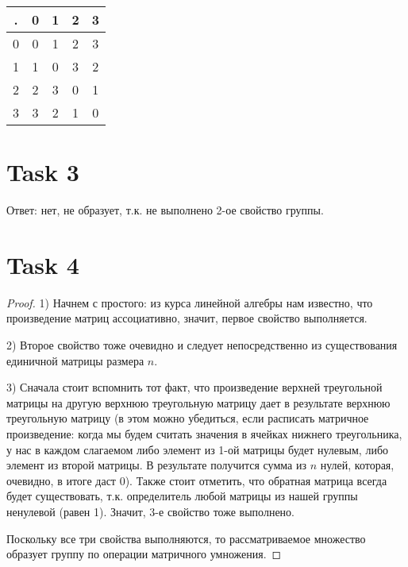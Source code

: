 \documentclass[12pt, a4paper]{article}
\begin{document}
\begin{center}
    \begin{tabular}{ | c | c | c | c | c | }
        \hline
        . & 0 & 1 & 2 & 3 \\ \hline
        0 & 0 & 1 & 2 & 3 \\ \hline
        1 & 1 & 0 & 3 & 2 \\ \hline
        2 & 2 & 3 & 0 & 1 \\ \hline
        3 & 3 & 2 & 1 & 0 \\ \hline
    \end{tabular}
\end{center} 

\section*{Task 3}

    Ответ: нет, не образует, т.к. не выполнено 2-ое свойство группы.

\section*{Task 4}

\begin{proof}
    
    1) Начнем с простого: из курса линейной алгебры нам известно, что произведение матриц ассоциативно,
    значит, первое свойство выполняется.

    2) Второе свойство тоже очевидно и следует непосредственно из существования единичной матрицы размера $n$.

    3) Сначала стоит вспомнить тот факт, что произведение верхней треугольной матрицы на другую верхнюю треугольную матрицу дает в результате верхнюю треугольную матрицу
    (в этом можно убедиться, если расписать матричное произведение: когда мы будем считать значения в ячейках нижнего треугольника, у нас в каждом слагаемом либо элемент из 1-ой матрицы будет нулевым, либо элемент из второй матрицы.
    В результате получится сумма из $n$ нулей, которая, очевидно, в итоге даст 0).
    Также стоит отметить, что обратная матрица всегда будет существовать, т.к. определитель любой матрицы из нашей группы ненулевой (равен 1).
    Значит, 3-е свойство тоже выполнено.

    Поскольку все три свойства выполняются, то рассматриваемое множество образует группу по операции матричного умножения.
\end{proof}     
\end{document}
